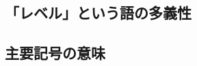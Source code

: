 
\subsection{「レベル」という語の多義性}\label{ss:conv-level-word}


\subsection{主要記号の意味}\label{ss:conv-symbols}

